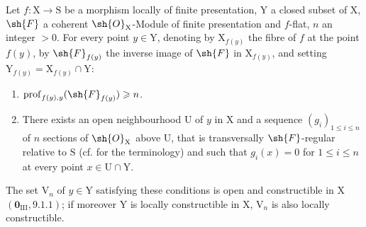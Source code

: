 \begin{proposition}[19.9.6]
\label{IV.19.9.6}
Let $f:\mathrm{X}\to\mathrm{S}$ be a morphism locally of finite presentation, $\mathrm{Y}$ a closed subset of $\mathrm{X}$, $\sh{F}$ a coherent $\sh{O}_\mathrm{X}$-Module of finite presentation and $f$-flat, $n$ an integer $>0$. For every point $y\in\mathrm{Y}$, denoting by $\mathrm{X}_{f(y)}$ the fibre of $f$ at the point $f(y)$, by $\sh{F}_{f(y)}$ the inverse image of $\sh{F}$ in $\mathrm{X}_{f(y)}$, and setting $\mathrm{Y}_{f(y)}=\mathrm{X}_{f(y)}\cap\mathrm{Y}$:
\begin{enumerate}
\item[\rm a)] $\operatorname{prof}_{f(y),y}(\sh{F}_{f(y)})\geqslant n$.
\item[\rm b)] There exists an open neighbourhood $\mathrm{U}$ of $y$ in $\mathrm{X}$ and a sequence $(g_i)_{1\leqslant i\leqslant n}$ of $n$ sections of $\sh{O}_\mathrm{X}$ above $\mathrm{U}$, that is transversally $\sh{F}$-regular relative to $\mathrm{S}$ (cf.  for the terminology) and such that $g_i(x)=0$ for $1\leqslant i\leqslant n$ at every point $x\in\mathrm{U}\cap\mathrm{Y}$.
\end{enumerate}

The set $\mathrm{V}_n$ of $y\in\mathrm{Y}$ satisfying these conditions is open and constructible in $\mathrm{X}$ $(\mathbf{0}_\mathrm{III},9.1.1)$; if moreover $\mathrm{Y}$ is locally constructible in $\mathrm{X}$, $\mathrm{V}_n$ is also locally constructible.
\end{proposition}

